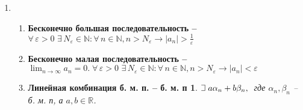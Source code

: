 \documentclass{article}
\theoremstyle{plain}
\def\letus{%
    \mathord{\setbox0=\hbox{$\exists$}%
             \hbox{\kern 0.125\wd0%
                   \vbox to \ht0{%
                      \hrule width 0.75\wd0%
                      \vfill%
                      \hrule width 0.75\wd0}%
                   \vrule height \ht0%
                   \kern 0.125\wd0}%
           }%
}
\begin{document}
\begin{enumerate}
\begin{enumerate}
\begin{proof}
            $$\lim_{n \to \infty}{x_n} = A \iff \forall\,\varepsilon > 0 \, \exists\,N_1\in\mathbb{N}: \forall\, n > N_1\rightarrow|x_n - A| < \varepsilon$$
            $$\lim_{n \to \infty}{z_n} = A \iff \forall\,\varepsilon > 0 \, \exists\,N_2\in\mathbb{N}: \forall\, n > N_1\rightarrow|z_n - A| < \varepsilon$$
            $$N = \max{\set{N_0, N_1, N_2}}.\,\forall n \ge N \rightarrow y_n \in U_\varepsilon(A)$$
            \end{proof}
            \item \newtheorem*{theorem8*}{Теорема о предельном переходе к неравенству}
            \begin{theorem8*}
            Если элементы сходящейся последовательности $\set{x_n}$, начиная с некоторого номера, удовлетворяют неравенству $x_n \ge b$, то и предел a этой последовательности удовлетворяет неравенству $a \ge b$.
            \end{theorem8*}
            \begin{proof}
             Пусть все элементы $\set{{x_n}}$, по крайней мере начиная с некоторого номера, удовлетворяют неравенству $x_n \ge b$. Предположим, что $a < b$. Поскольку a -- предел последовательности $\set{{x_n}}$, то для $\varepsilon = b - a,\, \varepsilon > 0\;\exists\, N\in \mathbb{N}: \forall\, n \ge N \rightarrow |x_n - a| < b - a.$ Это неравенство эквивалентно следующим двум неравенствам: $a - b < x_n - a < b - a$. Используя правое из этих неравенств, получим $x_n < b$. Противоречие.
            \end{proof}
        \end{enumerate}
        \item \begin{enumerate}
            \item \textbf{Бесконечно большая последовательность --} $ \forall\,\varepsilon > 0\,\, \exists\,N_{\varepsilon}\in \mathbb{N}: \forall\, n \in \mathbb{N}, n > N_{\varepsilon} \rightarrow |a_{n}| > \frac{1}{\varepsilon}$
            \item \textbf{Бесконечно малая последовательность -- } $\lim_{n \to \infty}{a_n} = 0.\;\forall\,\varepsilon > 0\,\, \exists\,N_{\varepsilon}\in \mathbb{N}: \forall\, n \in \mathbb{N}, n > N_{\varepsilon} \rightarrow |a_{n}| < \varepsilon$
            \item \newtheorem*{theorem9*}{Линейная комбинация б. м. п. -- б. м. п}
            \begin{theorem9*}
            $\letus\; a\alpha_n + b\beta_n,\;$ где $\alpha_n, \beta_n$ -- б. м. п, а $a, b \in \mathbb{R}$. 

\end{theorem9*}
\end{enumerate}
\end{enumerate}
\end{document}
